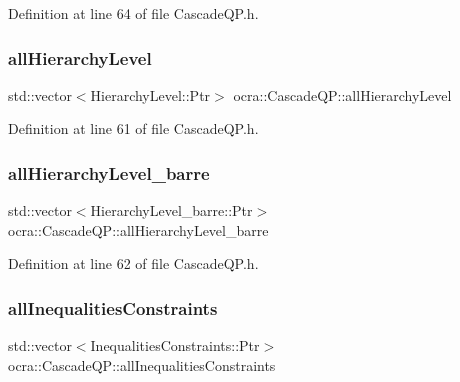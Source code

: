 Definition at line 64 of file Cascade\+Q\+P.\+h.

\hypertarget{classocra_1_1CascadeQP_add8c599dd93d116ae57c4c5d05cc2bc1}{}\label{classocra_1_1CascadeQP_add8c599dd93d116ae57c4c5d05cc2bc1} 
\subsubsection{\texorpdfstring{all\+Hierarchy\+Level}{allHierarchyLevel}}
{\footnotesize\ttfamily std\+::vector$<$Hierarchy\+Level\+::\+Ptr$>$ ocra\+::\+Cascade\+Q\+P\+::all\+Hierarchy\+Level\hspace{0.3cm}{\ttfamily [protected]}}



Definition at line 61 of file Cascade\+Q\+P.\+h.

\hypertarget{classocra_1_1CascadeQP_a83636f53370030bbb53359dae1e40833}{}\label{classocra_1_1CascadeQP_a83636f53370030bbb53359dae1e40833} 
\subsubsection{\texorpdfstring{all\+Hierarchy\+Level\+\_\+barre}{allHierarchyLevel\_barre}}
{\footnotesize\ttfamily std\+::vector$<$Hierarchy\+Level\+\_\+barre\+::\+Ptr$>$ ocra\+::\+Cascade\+Q\+P\+::all\+Hierarchy\+Level\+\_\+barre\hspace{0.3cm}{\ttfamily [protected]}}



Definition at line 62 of file Cascade\+Q\+P.\+h.

\hypertarget{classocra_1_1CascadeQP_a45c98a7eaf861a64c86a789ca524d550}{}\label{classocra_1_1CascadeQP_a45c98a7eaf861a64c86a789ca524d550} 
\subsubsection{\texorpdfstring{all\+Inequalities\+Constraints}{allInequalitiesConstraints}}
{\footnotesize\ttfamily std\+::vector$<$Inequalities\+Constraints\+::\+Ptr$>$ ocra\+::\+Cascade\+Q\+P\+::all\+Inequalities\+Constraints\hspace{0.3cm}{\ttfamily [protected]}}



